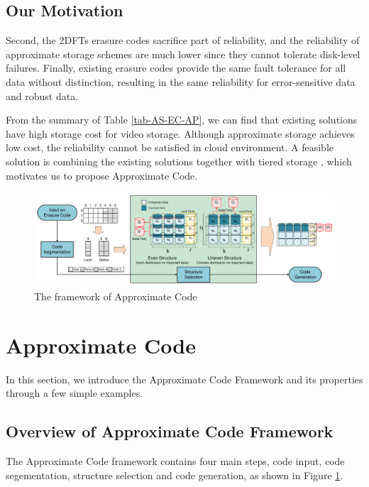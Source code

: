\documentclass[sigconf]{acmart}
\begin{document}
\subsection{Our Motivation}

Second, the 2DFTs erasure codes sacrifice part of reliability, and the reliability of approximate storage schemes are much lower since they cannot tolerate disk-level failures.
Finally, existing erasure codes provide the same fault tolerance for all data without distinction, resulting in the same reliability for error-sensitive data and robust data.

From the summary of Table \ref{tab-AS-EC-AP}, we can find that existing solutions have high storage cost for video storage. Although approximate storage achieves low cost, the reliability cannot be satisfied in cloud environment. A feasible solution is combining the existing solutions together with tiered storage \cite{krish2014hats} \cite{wang2014balancing} \cite{zhang2010automated} \cite{udipi2012lot}, which motivates us to propose Approximate Code.

\begin{figure}[ht!]
\centering
\includegraphics[width=\linewidth]{photo/Framework-v2.pdf}
\caption{The framework of Approximate Code}
\label{fig-framework}
\end{figure}

\section{Approximate Code}\label{ApCode}
In this section, we introduce the Approximate Code Framework and its properties through a few simple examples. 

\subsection{Overview of Approximate Code Framework}
The Approximate Code framework contains four main steps, code input, code segementation, structure selection and code generation, as shown in Figure \ref{fig-framework}.
\end{document}
